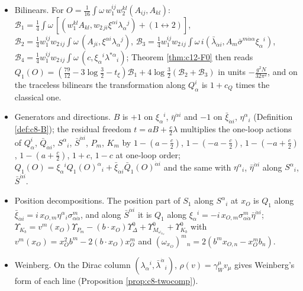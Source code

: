 \begin{remark}
\begin{itemize}
\item Bilinears. For $O=\tfrac1{16}\int\omega\,w_1^{ij}w_2^{kl}(A_{ij},A_{kl})$: $\mathcal B_1=\tfrac14\int\omega\,[(w_1^{kl}A_{kl},w_{2\,ji}\xi^{\alpha i}\lambda_\alpha{}^j)+(1\leftrightarrow2)]$, $\mathcal B_2=\tfrac14w_1^{ij}w_{2\,ij}\int\omega\,(A_{ji},\xi^{\alpha i}\lambda_\alpha{}^j)$, $\mathcal B_3=\tfrac14w_1^{ij}w_{2\,ij}\int\omega\,i(\bar\lambda_{\dot\alpha i},A_m\bar\sigma^{m\dot\alpha\alpha}\xi_\alpha{}^i)$, $\mathcal B_4=\tfrac14w_1^{ij}w_{2\,ij}\int\omega\,(c,\xi_\alpha{}^i\lambda^{*\alpha}{}_i)$; Theorem \ref{thm:c12-F0} then reads $Q_1(O)=(\tfrac{79}{12}-3\log\tfrac32-t_\xi)\mathcal B_1+4\log\tfrac32(\mathcal B_2+\mathcal B_3)$ in units $-\tfrac{g^2N}{32\pi^2}$, and on the traceless bilinears the transformation along $Q^i_\alpha$ is $1+c_Q$ times the classical one.
\item Generators and directions. $B$ is $+1$ on $\xi_\alpha{}^i$, $\bar\eta^{\dot\alpha i}$ and $-1$ on $\bar\xi_{\dot\alpha i}$, $\eta^\alpha{}_i$ (Definition \ref{def:c8-B}); the residual freedom $t=aB+\tfrac c2\lambda$ multiplies the one-loop actions of $Q^i_\alpha$, $\bar Q_{\dot\alpha i}$, $S^\alpha{}_i$, $\bar S^{\dot\alpha i}$, $P_m$, $K_m$ by $1-(a-\tfrac c2)$, $1-(-a-\tfrac c2)$, $1-(-a+\tfrac c2)$, $1-(a+\tfrac c2)$, $1+c$, $1-c$ at one-loop order; $Q_1(O)=\xi_\alpha{}^iQ_1(O)^\alpha{}_i+\bar\xi_{\dot\alpha i}\bar Q_1(O)^{\dot\alpha i}$ and the same with $\eta^\alpha{}_i$, $\bar\eta^{\dot\alpha i}$ along $S^\alpha{}_i$, $\bar S^{\dot\alpha i}$.
\item Position decompositions. The position part of $S_1$ along $S^\alpha{}_i$ at $x_O$ is $Q_1$ along $\bar\xi_{\dot\alpha i}=i\,x_{O,m}\eta^\alpha{}_i\sigma^m_{\alpha\dot\alpha}$, and along $\bar S^{\dot\alpha i}$ it is $Q_1$ along $\xi_\alpha{}^i=-i\,x_{O,m}\sigma^m_{\alpha\dot\alpha}\bar\eta^{\dot\alpha i}$; $\Upsilon_{K_b}=v^m(x_O)\Upsilon_{P_m}-(b\cdot x_O)\Upsilon^0_\Delta+\Upsilon^0_{M_{\omega_{x_O}}}+\Upsilon^0_{K_b}$ with $v^m(x_O)=x_O^2b^m-2(b\cdot x_O)x_O^m$ and $(\omega_{x_O})^m{}_n=2(b^mx_{O,n}-x_O^mb_n)$.
\item Weinberg. On the Dirac column $(\lambda_\alpha{}^i,\bar\lambda^{\dot\alpha}{}_i)$, $\rho(v)=\gamma_W^\mu v_\mu$ gives Weinberg's form of each line (Proposition \ref{prop:c8-twocomp}).
\end{itemize}
\end{remark}
